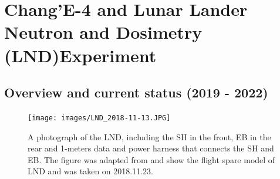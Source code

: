 \section{Chang'E-4 and Lunar Lander Neutron and Dosimetry (LND)Experiment}
\label{sec:change_4_LND}

\subsection{Overview and current status (2019 - 2022)}

\begin{figure}
    \centering
    \texttt{[image: images/LND\_2018-11-13.JPG]}
    \caption[A Photograph of the \ac{LND}]{A photograph of the \ac{LND}, including the \ac{SH} in the front, \ac{EB} in the rear and 1-meters data and power harness that connects the \ac{SH} and \ac{EB}. The figure was adapted from \citet{Wimmer2020SSRv} and show the flight spare model of LND and was taken on 2018.11.23.}
    \label{Fig:LND_instrument}
\end{figure}


